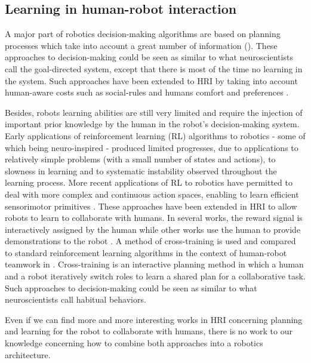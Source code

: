 \documentclass[english,a4paper,11pt,twoside]{StyleThese}
\begin{document}
\subsection{Learning in human-robot interaction}

A major part of robotics decision-making algorithms are based on planning processes which take into account a great number of information (\cite{ingrand2014deliberation}). These approaches to decision-making could be seen as similar to what neuroscientists call the goal-directed system, except that there is most of the time no learning in the system. Such approaches have been extended to HRI by taking into account human-aware costs such as social-rules and humans comfort and preferences \cite{cirillo2010human,Lallement2014hatp}.

Besides, robots learning abilities are still very limited and require the injection of important prior knowledge by the human in the robot’s decision-making system. Early applications of reinforcement learning (RL) algorithms to robotics \cite{hayes1994robot, morimoto2001acquisition, smart2002effective} - some of which being neuro-inspired - produced limited progresses, due to applications to relatively simple problems (with a small number of states and actions), to slowness in learning and to systematic instability observed throughout the learning process. More recent applications of RL to robotics have permitted to deal with more complex and continuous action spaces, enabling to learn efficient sensorimotor primitives \cite{kober2011learning, martins2010learning, stulp2013robot}. These approaches have been extended in HRI to allow robots to learn to collaborate with humans.
In several works, the reward signal is interactively assigned by the human \cite{kaplan2002robotic, knox2012reinforcement} while other works use the human to provide demonstrations to the robot \cite{nicolescu2003natural, thomaz2006reinforcement}.
A method of cross-training is used and compared to standard reinforcement learning algorithms in the context of human-robot teamwork in \cite{nikolaidis2013human}. Cross-training is an interactive planning method in which a human and a robot iteratively switch roles to learn a shared plan for a collaborative task. Such approaches to decision-making could be seen as similar to what neuroscientists call habitual behaviors.

Even if we can find more and more interesting works in HRI concerning planning and learning for the robot to collaborate with humans, there is no work to our knowledge concerning how to combine both approaches into a robotics architecture.
\end{document}
